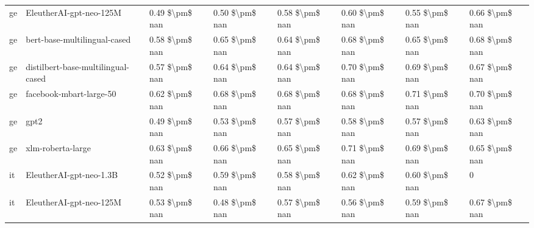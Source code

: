 \begin{tabular}{llllllll}
      ge &            EleutherAI-gpt-neo-125M & 0.49 \$\textbackslash pm\$ nan &            0.50 \$\textbackslash pm\$ nan &        0.58 \$\textbackslash pm\$ nan &         0.60 \$\textbackslash pm\$ nan &                          0.55 \$\textbackslash pm\$ nan &     0.66 \$\textbackslash pm\$ nan \\
      ge &       bert-base-multilingual-cased & 0.58 \$\textbackslash pm\$ nan &            0.65 \$\textbackslash pm\$ nan &        0.64 \$\textbackslash pm\$ nan &         0.68 \$\textbackslash pm\$ nan &                          0.65 \$\textbackslash pm\$ nan &     0.68 \$\textbackslash pm\$ nan \\
      ge & distilbert-base-multilingual-cased & 0.57 \$\textbackslash pm\$ nan &            0.64 \$\textbackslash pm\$ nan &        0.64 \$\textbackslash pm\$ nan &         0.70 \$\textbackslash pm\$ nan &                          0.69 \$\textbackslash pm\$ nan &     0.67 \$\textbackslash pm\$ nan \\
      ge &            facebook-mbart-large-50 & 0.62 \$\textbackslash pm\$ nan &            0.68 \$\textbackslash pm\$ nan &        0.68 \$\textbackslash pm\$ nan &         0.68 \$\textbackslash pm\$ nan &                          0.71 \$\textbackslash pm\$ nan &     0.70 \$\textbackslash pm\$ nan \\
      ge &                               gpt2 & 0.49 \$\textbackslash pm\$ nan &            0.53 \$\textbackslash pm\$ nan &        0.57 \$\textbackslash pm\$ nan &         0.58 \$\textbackslash pm\$ nan &                          0.57 \$\textbackslash pm\$ nan &     0.63 \$\textbackslash pm\$ nan \\
      ge &                  xlm-roberta-large & 0.63 \$\textbackslash pm\$ nan &            0.66 \$\textbackslash pm\$ nan &        0.65 \$\textbackslash pm\$ nan &         0.71 \$\textbackslash pm\$ nan &                          0.69 \$\textbackslash pm\$ nan &     0.65 \$\textbackslash pm\$ nan \\
      it &            EleutherAI-gpt-neo-1.3B & 0.52 \$\textbackslash pm\$ nan &            0.59 \$\textbackslash pm\$ nan &        0.58 \$\textbackslash pm\$ nan &         0.62 \$\textbackslash pm\$ nan &                          0.60 \$\textbackslash pm\$ nan &                  0 \\
      it &            EleutherAI-gpt-neo-125M & 0.53 \$\textbackslash pm\$ nan &            0.48 \$\textbackslash pm\$ nan &        0.57 \$\textbackslash pm\$ nan &         0.56 \$\textbackslash pm\$ nan &                          0.59 \$\textbackslash pm\$ nan &     0.67 \$\textbackslash pm\$ nan \\

\end{tabular}
